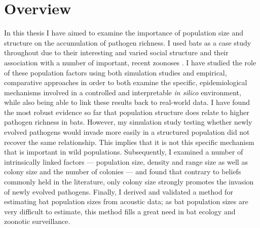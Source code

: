 
\section{Overview}

In this thesis I have aimed to examine the importance of population size and structure on the accumulation of pathogen richness.
I used bats as a case study throughout due to their interesting and varied social structure \cite{kerth2008causes} and their association with a number of important, recent zoonoses \cite{leroy2005fruit, field2001natural, halpin2011pteropid, li2005bats}.
I have studied the role of these population factors using both simulation studies and empirical, comparative approaches in order to both examine the specific, epidemiological mechanisms involved in a controlled and interpretable \emph{in silico} environment, while also being able to link these results back to real-world data.
I have found the most robust evidence so far that population structure does relate to higher pathogen richness in bats.
However, my simulation study testing whether newly evolved pathogens would invade more easily in a structured population did not recover the same relationship. 
This implies that it is not this specific mechanism that is important in wild populations.
Subsequently, I examined a number of intrinsically linked factors --- population size, density and range size as well as colony size and the number of colonies --- and found that contrary to beliefs commonly held in the literature, only colony size strongly promotes the invasion of newly evolved pathogens.
Finally, I derived and validated a method for estimating bat population sizes from acoustic data; as bat population sizes are very difficult to estimate, this method fills a great need in bat ecology and zoonotic surveillance.




